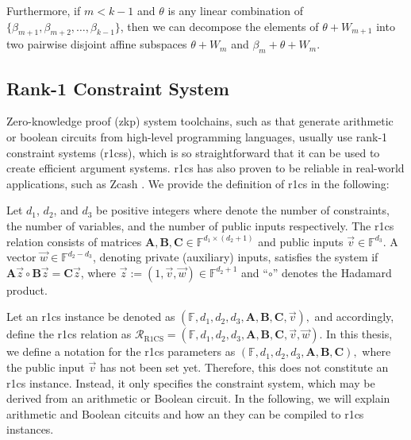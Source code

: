 Furthermore, if $m < k-1$ and $\theta$ is any linear combination of $\{\beta_{m+1}, \beta_{m+2}, \ldots, \beta_{k-1}\}$, then we can decompose the elements of $\theta + W_{m+1}$ into two pairwise disjoint affine subspaces $\theta + W_m$ and $\beta_{m} + \theta + W_m$.

\subsection{Rank-1 Constraint System}

Zero-knowledge proof (\gls{zkp}) system toolchains, such as \cite{Groth2016, Aurora2019, Chiesa2020Fractal, Ames2017Ligero} that generate arithmetic or boolean circuits from high-level programming languages, usually use rank-1 constraint systems (\gls{r1cs}s), which is so straightforward that it can be used to create efficient argument systems. \gls{r1cs} has also proven to be reliable in real-world applications, such as Zcash \cite{zcash2014}. We provide the definition of \gls{r1cs} in the following:

\begin{definition} \label{def:R1CS}
	Let $d_1$, $d_2$, and $d_3$ be positive integers where denote the number of constraints, the number of variables, and the number of public inputs respectively. The \gls{r1cs} relation consists of matrices $\mathbf{A},\mathbf{B},\mathbf{C} \in \mathbb{F}^{d_1\times (d_2+1)}$ and public inputs $\vec{{v}} \in \mathbb{F}^{d_3}$. A vector $\vec{{w}} \in \mathbb{F}^{d_2-d_3}$, denoting private (auxiliary) inputs, satisfies the system if
	\(
	\mathbf{A}\vec{{z}} \circ \mathbf{B}\vec{{z}} = \mathbf{C}\vec{{z}}
	\), 
	where $\vec{z}:=(1,\vec{v},\vec{w}) \in \mathbb{F}^{d_2+1}$ and “$\circ$” denotes the Hadamard product.
\end{definition}
Let an \gls{r1cs} instance be denoted as 
\(
(\mathbb{F}, d_1, d_2, d_3, \mathbf{A}, \mathbf{B}, \mathbf{C}, \vec{v}),
\)
and accordingly, define the \gls{r1cs} relation as
\(
\mathcal{R}_{\text{R1CS}} = (\mathbb{F}, d_1, d_2, d_3, \mathbf{A}, \mathbf{B}, \mathbf{C}, \vec{v}, \vec{w}).
\)
In this thesis, we define a notation for the \gls{r1cs} parameters as 
\(
(\mathbb{F}, d_1, d_2, d_3, \mathbf{A}, \mathbf{B}, \mathbf{C}),
\)
where the public input \(\vec{v}\) has not been set yet. Therefore, this does not constitute an \gls{r1cs} instance. Instead, it only specifies the constraint system, which may be derived from an arithmetic or Boolean circuit. In the following, we will explain arithmetic and Boolean citcuits and how an they can be compiled to \gls{r1cs} instances.


